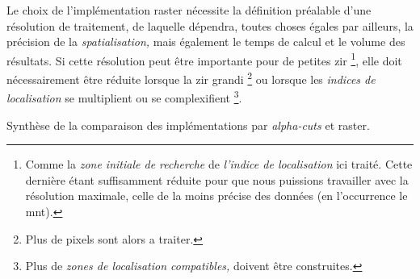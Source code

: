 Le choix de l'implémentation raster nécessite la définition préalable
d'une résolution de traitement, de laquelle dépendra, toutes choses
égales par ailleurs, la précision de la \emph{spatialisation,} mais
également le temps de calcul et le volume des résultats. Si cette
résolution peut être importante pour de petites \ac{zir}
\footnote{Comme la \emph{zone initiale de recherche} de \emph{l'indice
    de localisation} ici traité. Cette dernière étant suffisamment
  réduite pour que nous puissions travailler avec la résolution
  maximale, celle de la moins précise des données (en l’occurrence le
  \ac{mnt}).}, elle doit nécessairement être réduite lorsque la
\ac{zir} grandi \footnote{Plus de pixels sont alors a traiter.} ou
lorsque les \emph{indices de localisation} se multiplient ou se
complexifient \footnote{Plus de \emph{zones de localisation
    compatibles,} doivent être construites.}.

\begin{landscape}
  \begin{table}[H]
    \centering
    
    \caption{Synthèse de la comparaison des implémentations par
      \emph{alpha-cuts} et raster.}
    \label{tab:comp_implems}
  \end{table}
\end{landscape}


